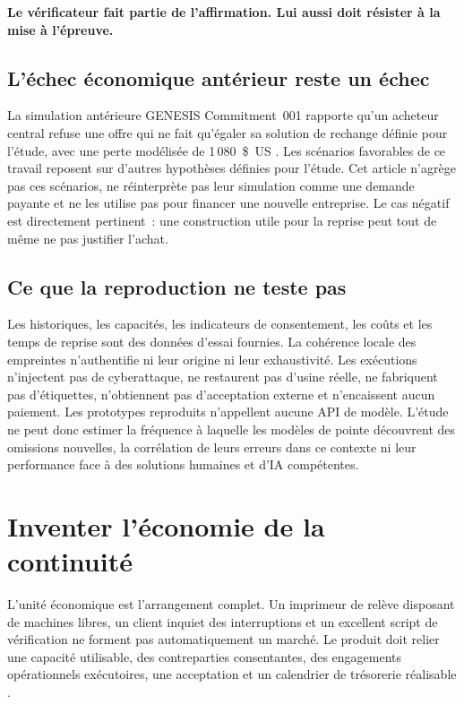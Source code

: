 \documentclass[11pt,a4paper]{article}
\newcommand{\chapterpage}{\clearpage}
\begin{document}
\begin{insight}
\textbf{Le vérificateur fait partie de l’affirmation. Lui aussi doit résister à la mise à l’épreuve.}
\end{insight}

\subsection{L’échec économique antérieur reste un échec}
La simulation antérieure GENESIS Commitment~001 rapporte qu’un acheteur central refuse une offre qui ne fait qu’égaler sa solution de rechange définie pour l’étude, avec une perte modélisée de 1\,080~\$~US \cite{genesisResults}. Les scénarios favorables de ce travail reposent sur d’autres hypothèses définies pour l’étude. Cet article n’agrège pas ces scénarios, ne réinterprète pas leur simulation comme une demande payante et ne les utilise pas pour financer une nouvelle entreprise. Le cas négatif est directement pertinent~: une construction utile pour la reprise peut tout de même ne pas justifier l’achat.

\subsection{Ce que la reproduction ne teste pas}
Les historiques, les capacités, les indicateurs de consentement, les coûts et les temps de reprise sont des données d’essai fournies. La cohérence locale des empreintes n’authentifie ni leur origine ni leur exhaustivité. Les exécutions n’injectent pas de cyberattaque, ne restaurent pas d’usine réelle, ne fabriquent pas d’étiquettes, n’obtiennent pas d’acceptation externe et n’encaissent aucun paiement. Les prototypes reproduits n’appellent aucune API de modèle. L’étude ne peut donc estimer la fréquence à laquelle les modèles de pointe découvrent des omissions nouvelles, la corrélation de leurs erreurs dans ce contexte ni leur performance face à des solutions humaines et d’IA compétentes.

\chapterpage
\section{Inventer l’économie de la continuité}\label{sec:economy}
L’unité économique est l’arrangement complet. Un imprimeur de relève disposant de machines libres, un client inquiet des interruptions et un excellent script de vérification ne forment pas automatiquement un marché. Le produit doit relier une capacité utilisable, des contreparties consentantes, des engagements opérationnels exécutoires, une acceptation et un calendrier de trésorerie réalisable \cite{boucherEconomy}.
\end{document}
